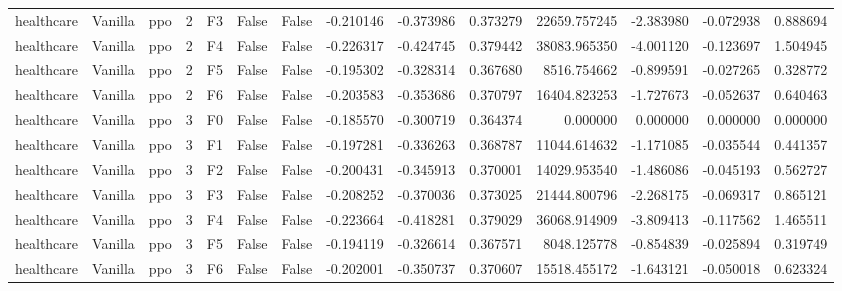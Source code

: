 \begin{tabular}{lllrlllrrrrrrr}
healthcare & Vanilla &       ppo &     2 &  F3 &           False &            False & -0.210146 & -0.373986 & 0.373279 &     22659.757245 &          -2.383980 &       -0.072938 &            0.888694 \\
healthcare & Vanilla &       ppo &     2 &  F4 &           False &            False & -0.226317 & -0.424745 & 0.379442 &     38083.965350 &          -4.001120 &       -0.123697 &            1.504945 \\
healthcare & Vanilla &       ppo &     2 &  F5 &           False &            False & -0.195302 & -0.328314 & 0.367680 &      8516.754662 &          -0.899591 &       -0.027265 &            0.328772 \\
healthcare & Vanilla &       ppo &     2 &  F6 &           False &            False & -0.203583 & -0.353686 & 0.370797 &     16404.823253 &          -1.727673 &       -0.052637 &            0.640463 \\
healthcare & Vanilla &       ppo &     3 &  F0 &           False &            False & -0.185570 & -0.300719 & 0.364374 &         0.000000 &           0.000000 &        0.000000 &            0.000000 \\
healthcare & Vanilla &       ppo &     3 &  F1 &           False &            False & -0.197281 & -0.336263 & 0.368787 &     11044.614632 &          -1.171085 &       -0.035544 &            0.441357 \\
healthcare & Vanilla &       ppo &     3 &  F2 &           False &            False & -0.200431 & -0.345913 & 0.370001 &     14029.953540 &          -1.486086 &       -0.045193 &            0.562727 \\
healthcare & Vanilla &       ppo &     3 &  F3 &           False &            False & -0.208252 & -0.370036 & 0.373025 &     21444.800796 &          -2.268175 &       -0.069317 &            0.865121 \\
healthcare & Vanilla &       ppo &     3 &  F4 &           False &            False & -0.223664 & -0.418281 & 0.379029 &     36068.914909 &          -3.809413 &       -0.117562 &            1.465511 \\
healthcare & Vanilla &       ppo &     3 &  F5 &           False &            False & -0.194119 & -0.326614 & 0.367571 &      8048.125778 &          -0.854839 &       -0.025894 &            0.319749 \\
healthcare & Vanilla &       ppo &     3 &  F6 &           False &            False & -0.202001 & -0.350737 & 0.370607 &     15518.455172 &          -1.643121 &       -0.050018 &            0.623324 \\

\end{tabular}
